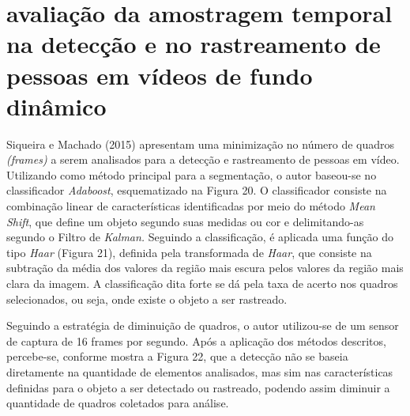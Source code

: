 \documentclass[12pt,oneside,a4paper,chapter=TITLE,section=TITLE,sumario=tradicional]{abntex2}
\begin{document}
\section{avaliação da amostragem temporal na detecção e no rastreamento de pessoas em vídeos de fundo dinâmico}
Siqueira e Machado (2015) apresentam uma minimização no número de quadros \textit{(frames)} a serem analisados para a detecção e rastreamento de pessoas em vídeo. Utilizando como método principal para a segmentação, o autor baseou-se no classificador \textit{Adaboost}, esquematizado na Figura 20. O classificador consiste na combinação linear de características identificadas por meio do método \textit{Mean Shift}, que define um objeto segundo suas medidas ou cor e delimitando-as segundo o Filtro de \textit{Kalman.}
Seguindo a classificação, é aplicada uma função do tipo \textit{Haar} (Figura 21), definida pela transformada de \textit{Haar}, que consiste na subtração da média dos valores da região mais escura pelos valores da região mais clara da imagem. A classificação dita forte se dá pela taxa de acerto nos quadros selecionados, ou seja, onde existe o objeto a ser rastreado.

\begin{figure}[htb]
\end{figure}

\begin{figure}[htb]
\end{figure}

Seguindo a estratégia de diminuição de quadros, o autor utilizou-se de um sensor de captura de 16 frames por segundo. Após a aplicação dos métodos descritos, percebe-se, conforme mostra a Figura 22, que a detecção não se baseia diretamente na quantidade de elementos analisados, mas sim nas características definidas para o objeto a ser detectado ou rastreado, podendo assim diminuir a quantidade de quadros coletados para análise.

\begin{figure}[htb]
\end{figure}
\end{document}
